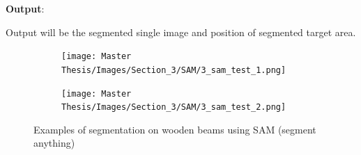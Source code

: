 \hspace*{\fill}

\textbf{Output}:

Output will be the segmented single image and position of segmented target area.

\begin{figure}[ht]
  \centering
    \begin{subfigure}[b]{0.3\textwidth}
      \centering
        \texttt{[image: Master Thesis/Images/Section\_3/SAM/3\_sam\_test\_1.png]}
    \end{subfigure}
    \hspace{1cm}
    \begin{subfigure}[b]{0.3\textwidth}
      \centering
        \texttt{[image: Master Thesis/Images/Section\_3/SAM/3\_sam\_test\_2.png]}
    \end{subfigure}
  \caption{Examples of segmentation on wooden beams using SAM (segment anything)}
\label{fig:sam_test}
\end{figure}

\hspace*{\fill}


